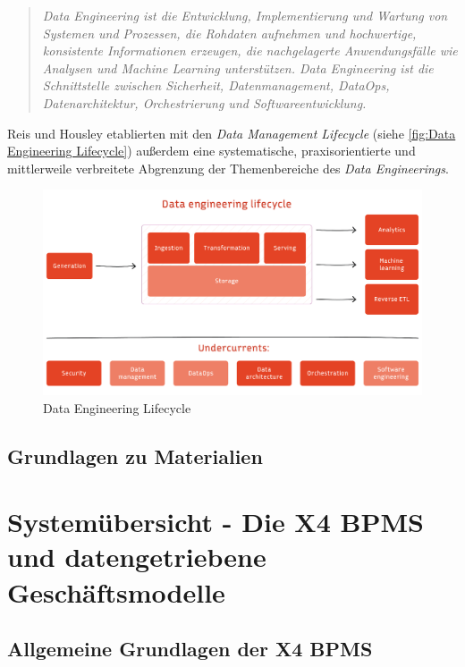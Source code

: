 \begin{quote}
    \textit{Data Engineering ist die Entwicklung, Implementierung und Wartung von Systemen und Prozessen, die Rohdaten aufnehmen und hochwertige, konsistente Informationen erzeugen, die nachgelagerte Anwendungsfälle wie Analysen und Machine Learning unterstützen. Data Engineering ist die Schnittstelle zwischen Sicherheit, Datenmanagement, DataOps, Datenarchitektur, Orchestrierung und Softwareentwicklung.}
\end{quote}

Reis und Housley etablierten mit den \textit{Data Management Lifecycle} (siehe \autoref{fig:Data Engineering Lifecycle}) außerdem eine systematische, praxisorientierte und mittlerweile verbreitete Abgrenzung der Themenbereiche des \textit{Data Engineerings}. 

\begin{figure}
    \centering
    \includegraphics[width=1\linewidth]{Grafiken/Data Engineering Lifecycle.png}
    \caption{Data Engineering Lifecycle}
    \label{fig:Data Engineering Lifecycle}
\end{figure}

\subsection{Grundlagen zu Materialien}

\section{Systemübersicht - Die X4 BPMS und datengetriebene Geschäftsmodelle}
\label{Systemübersicht}

\subsection{Allgemeine Grundlagen der X4 BPMS}

